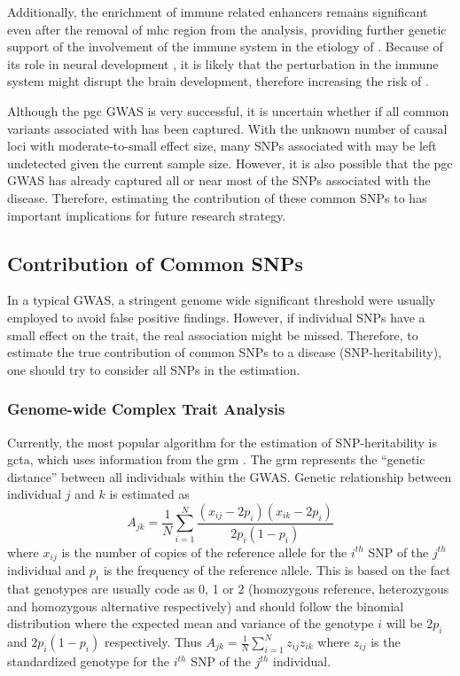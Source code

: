 \documentclass[12pt]{scrbook}
\newcommand*{\glng}{\glsentrylong}
\begin{document}
	Additionally, the enrichment of immune related enhancers remains significant even after the removal of \gls{mhc} region from the analysis, providing further genetic support of the involvement of the immune system in the etiology of \glng{scz}.
	Because of its role in neural development \citep{Zhao1998,Deverman2009}, it is likely that the perturbation in the immune system might disrupt the brain development, therefore increasing the risk of \glng{scz}.
	
	Although the \gls{pgc} \glng{scz} \gls{GWAS} is very successful, it is uncertain whether if all common variants associated with \glng{scz} has been captured. 
	With the unknown number of causal loci with moderate-to-small effect size, many \glspl{SNP} associated with \glng{scz} may be left undetected given the current sample size. 
	However, it is also possible that the \gls{pgc} \glng{scz} \gls{GWAS} has already captured all or near most of the \glspl{SNP} associated with the disease. 
	Therefore, estimating the contribution of these common \glspl{SNP} to \glng{scz} has important implications for future research strategy.
	
	\subsection{Contribution of Common SNPs}
	In a typical \gls{GWAS}, a stringent genome wide significant threshold were usually employed to avoid false positive findings. 
	However, if individual \glspl{SNP} have a small effect on the trait, the real association might be missed.
	Therefore, to estimate the true contribution of common \glspl{SNP} to a disease (\gls{SNP}-heritability), one should try to consider all \glspl{SNP} in the estimation.
	
	\subsubsection{Genome-wide Complex Trait Analysis}
	Currently, the most popular algorithm for the estimation of \gls{SNP}-heritability is \gls{gcta}, which uses information from the \gls{grm} \citep{Yang2011}.
	The \gls{grm} represents the ``genetic distance'' between all individuals within the \gls{GWAS}.
	Genetic relationship between individual $j$ and $k$ is estimated as 
	\begin{equation}
	A_{jk} = \frac{1}{N}\sum^N_{i=1}\frac{(x_{ij}-2p_i)(x_{ik}-2p_i)}{2p_i(1-p_i)}
	\end{equation}
	where $x_{ij}$ is the number of copies of the reference allele for the $i^{th}$ \gls{SNP} of the $j^{th}$ individual and $p_i$ is the frequency of the reference allele.
	This is based on the fact that genotypes are usually code as 0, 1 or 2 (homozygous reference, heterozygous and homozygous alternative respectively) and should follow the binomial distribution where the expected mean and variance of the genotype $i$ will be $2p_i$ and $2p_i(1-p_i)$ respectively.
	Thus $A_{jk} = \frac{1}{N}\sum^N_{i=1}z_{ij}z_{ik}$ where $z_{ij}$ is the standardized genotype for the $i^{th}$ \gls{SNP} of the $j^{th}$ individual.
	
\end{document}
